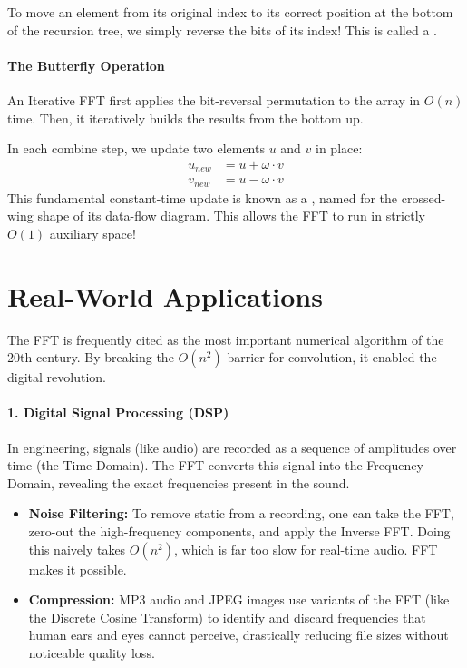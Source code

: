 \documentclass[11  pt]{article}
\begin{document}
\vs{0.5cm}
To move an element from its original index to its correct position at the bottom of the recursion tree, we simply reverse the bits of its index! This is called a .

\vs{0.5cm}
\paragraph{The Butterfly Operation}
An Iterative FFT first applies the bit-reversal permutation to the array in $O(n)$ time. Then, it iteratively builds the results from the bottom up. 

In each combine step, we update two elements $u$ and $v$ in place:
\begin{align*}
    u_{new} &= u + \omega \cdot v \\
    v_{new} &= u - \omega \cdot v
\end{align*}
This fundamental constant-time update is known as a , named for the crossed-wing shape of its data-flow diagram. This allows the FFT to run in strictly $O(1)$ auxiliary space!

\newpage

\section{Real-World Applications}

The FFT is frequently cited as the most important numerical algorithm of the 20th century. By breaking the $O(n^2)$ barrier for convolution, it enabled the digital revolution. 

\vs{0.5cm}

\paragraph{1. Digital Signal Processing (DSP)}
In engineering, signals (like audio) are recorded as a sequence of amplitudes over time (the Time Domain). The FFT converts this signal into the Frequency Domain, revealing the exact frequencies present in the sound.
\begin{itemize}
    \item \textbf{Noise Filtering:} To remove static from a recording, one can take the FFT, zero-out the high-frequency components, and apply the Inverse FFT. Doing this naively takes $O(n^2)$, which is far too slow for real-time audio. FFT makes it possible.
    \item \textbf{Compression:} MP3 audio and JPEG images use variants of the FFT (like the Discrete Cosine Transform) to identify and discard frequencies that human ears and eyes cannot perceive, drastically reducing file sizes without noticeable quality loss.
\end{itemize}
\end{document}
